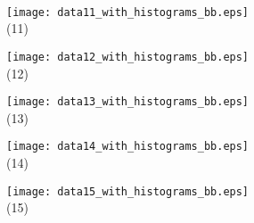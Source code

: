 \documentclass[journal]{vgtc}                %
\begin{document}
\begin{figure*}[ht!]
    \mbox{} \\   \smallskip
  
  \begin{minipage}{0.19\textwidth}
   \centering
     \texttt{[image: data11\_with\_histograms\_bb.eps]}\\
     \footnotesize (11)
  \end{minipage}
  \hfill
  \begin{minipage}{0.19\textwidth}
   \centering
     \texttt{[image: data12\_with\_histograms\_bb.eps]}\\
     \footnotesize (12)
  \end{minipage}
  \hfill
  \begin{minipage}{0.19\textwidth}
   \centering
     \texttt{[image: data13\_with\_histograms\_bb.eps]}\\
     \footnotesize (13)
  \end{minipage}
  \hfill
  \begin{minipage}{0.19\textwidth}
   \centering
     \texttt{[image: data14\_with\_histograms\_bb.eps]}\\
     \footnotesize (14)
  \end{minipage}
  \hfill
  \begin{minipage}{0.19\textwidth}
   \centering
     \texttt{[image: data15\_with\_histograms\_bb.eps]}\\
     \footnotesize (15)
  \end{minipage}

    \mbox{}  \smallskip


\end{figure*}
\end{document}
